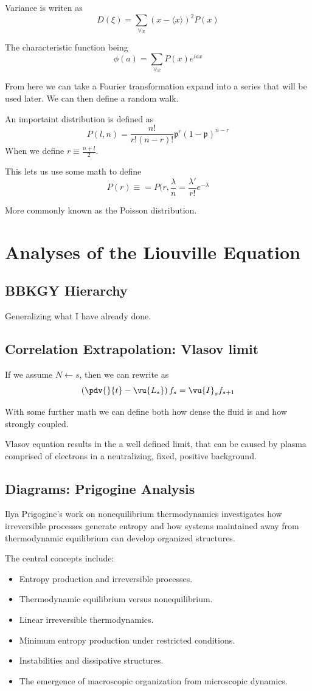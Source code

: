 Variance is writen as
\[
D(\xi) = \sum_{\forall x}(x - \langle x \rangle)^2 P(x)
  \]

  The characteristic function being
\[
  \phi(a) = \sum_{\forall x} P(x)e^{iax}  \]

From here we can take a Fourier transformation expand into a series that will be used later. We can then define a random walk.

An importaint distribution is defined as
\[
P(l,n) = \frac{n !}{r!(n-r)!}\mathfrak{p}^r(1- \mathfrak{p})^{n-r}
  \]
  When we define $r \equiv \frac{n+l}{2}$.

This lets us use some math to define
\[
    P(r) \equiv = P(r, \frac{\lambda}{n} = \frac{\lambda '}{r!}e^{-\lambda}  \]

More commonly known as the Poisson distribution.

\section{Analyses of the Liouville Equation}

\subsection{BBKGY Hierarchy}

Generalizing what I have already done.

\subsection{Correlation Extrapolation: Vlasov limit}
If we assume $N \gets s$, then we can rewrite as
\[
\left(\pdv{}{t} - \vu{L_s}  \right)f_s = \vu{I}_s f_{s+1}
  \]

  With some further math we can define both how dense the fluid is and how strongly coupled.

  Vlasov equation results in the a well defined limit, that can be caused by plasma comprised of electrons in a neutralizing, fixed, positive background.


\subsection{Diagrams: Prigogine Analysis}
Ilya Prigogine's work on nonequilibrium thermodynamics
investigates how irreversible processes generate entropy
and how systems maintained away from thermodynamic
equilibrium can develop organized structures.

The central concepts include:
\begin{itemize}
    \item Entropy production and irreversible processes.
    \item Thermodynamic equilibrium versus nonequilibrium.
    \item Linear irreversible thermodynamics.
    \item Minimum entropy production under restricted conditions.
    \item Instabilities and dissipative structures.
    \item The emergence of macroscopic organization from
          microscopic dynamics.
\end{itemize}

